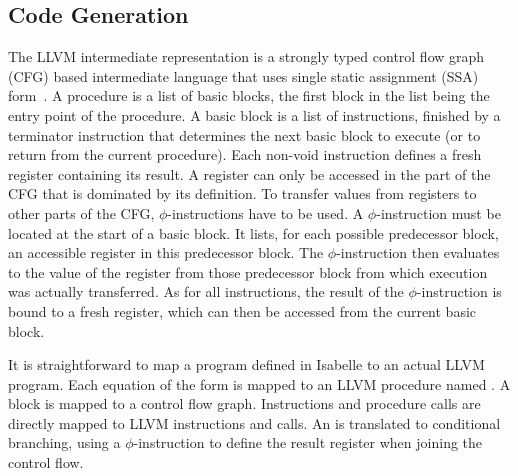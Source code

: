\documentclass[a4paper,oribibl,envcountsame]{llncs}
\begin{document}
\subsection{Code Generation}
The LLVM intermediate representation \cite{LLVM-manual} is a strongly typed control flow graph (CFG) based intermediate language 
that uses single static assignment (SSA) form~\cite{CFRWZ91}.
A procedure is a list of basic blocks, the first block in the list being the entry point of the procedure. 
A basic block is a list of instructions, finished by a terminator instruction that determines the next basic block to execute (or to return from the current procedure).
Each non-void instruction defines a fresh register containing its result. A register can only be accessed in the part of the CFG that is dominated by its definition.
To transfer values from registers to other parts of the CFG, $\phi$-instructions have to be used. 
A $\phi$-instruction must be located at the start of a basic block. 
It lists, for each possible predecessor block, an accessible register in this predecessor block. 
The $\phi$-instruction then evaluates to the value of the register from those predecessor block from which execution was actually transferred. 
As for all instructions, the result of the $\phi$-instruction is bound to a fresh register, which can then be accessed from the current basic block.


It is straightforward to map a program defined in Isabelle to an actual LLVM program.
Each equation of the form  is mapped to an LLVM procedure named . 
A block is mapped to a control flow graph. Instructions and procedure calls are directly mapped to LLVM instructions and calls.
An  is translated to conditional branching, using a $\phi$-instruction to define the result register  when joining the control flow.
\end{document}
